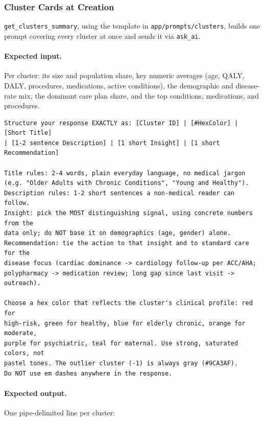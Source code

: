 \subsubsection*{Cluster Cards at Creation}

\texttt{get\_clusters\_summary}, using the template in \texttt{app/prompts/clusters}, builds one prompt covering every cluster at once and sends it via \texttt{ask\_ai}.

\paragraph{Expected input.} Per cluster: its size and population share, key numeric averages (age, QALY, DALY, procedures, medications, active conditions), the demographic and disease-rate mix, the dominant care plan share, and the top conditions, medications, and procedures.

\vspace{0.25cm}

\begin{lstlisting}[style=pythonstyle]
Structure your response EXACTLY as: [Cluster ID] | [#HexColor] | [Short Title]
| [1-2 sentence Description] | [1 short Insight] | [1 short Recommendation]

Title rules: 2-4 words, plain everyday language, no medical jargon
(e.g. "Older Adults with Chronic Conditions", "Young and Healthy").
Description rules: 1-2 short sentences a non-medical reader can follow.
Insight: pick the MOST distinguishing signal, using concrete numbers from the
data only; do NOT base it on demographics (age, gender) alone.
Recommendation: tie the action to that insight and to standard care for the
disease focus (cardiac dominance -> cardiology follow-up per ACC/AHA;
polypharmacy -> medication review; long gap since last visit -> outreach).

Choose a hex color that reflects the cluster's clinical profile: red for
high-risk, green for healthy, blue for elderly chronic, orange for moderate,
purple for psychiatric, teal for maternal. Use strong, saturated colors, not
pastel tones. The outlier cluster (-1) is always gray (#9CA3AF).
Do NOT use em dashes anywhere in the response.
\end{lstlisting}

\paragraph{Expected output.} One pipe-delimited line per cluster:

